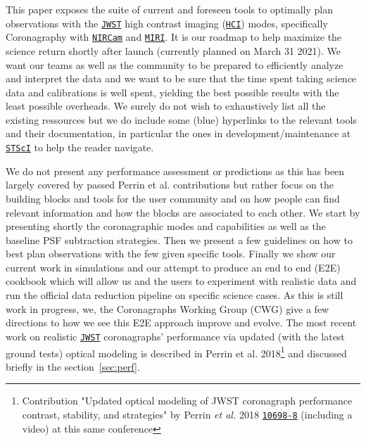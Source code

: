 \documentclass[]{spie}  %
\newcommand{\stsci}{{\tt \href{https://www.stsci.edu}{STScI}}\xspace}
\newcommand{\jwst}{{\tt \href{https://jwst.stsci.edu}{JWST}}\xspace}
\newcommand{\nircam}{{\tt \href{https://jwst.stsci.edu/instrumentation/nircam}{NIRCam}}\xspace}
\newcommand{\miri}{{\tt \href{https://jwst.stsci.edu/instrumentation/miri}{MIRI}}\xspace}
\newcommand{\hci}{{\tt \href{https://jwst-docs.stsci.edu/display/JPP/JWST+High-Contrast+Imaging?q=High}{HCI}}\xspace}%
\begin{document}
This paper exposes the suite of current and foreseen tools to optimally plan observations with the \jwst high contrast imaging\cite{jdox_hci} (\hci) modes, specifically Coronagraphy with \nircam and \miri. It is our roadmap to help maximize the science return shortly after launch (currently planned on March 31 2021).  We want our teams as well as the community to be prepared to efficiently analyze and interpret the data and we want to be sure that the time spent taking science data and calibrations is well spent, yielding the best possible results with the least possible overheads. We surely do not wish to exhaustively list all the existing ressources but we do include some (blue) hyperlinks to the relevant tools and their documentation\cite{jdox_general}, in particular the ones in development/maintenance at \stsci to help the reader navigate.

We do not present any performance assessment or predictions as this has been largely covered by passed Perrin et al. contributions \cite{perrin2014_webbPSF, perrin2016_JWST_WFS, perrin2018_JWST_AAS, perrin2018_JWST_coro_perfs} but rather focus on the building blocks and tools for the user community and on how people can find relevant information and how the blocks are associated to each other. We start by presenting shortly the coronagraphic modes and capabilities as well as the baseline PSF subtraction strategies. Then we present a few guidelines on how to best plan observations with the few given specific tools. Finally we show our current work in simulations and our attempt to produce an end to end (E2E) cookbook which will allow us and the users to experiment with realistic data and run the official data reduction pipeline on specific science cases. As this is still work in progress, we, the Coronagraphs Working Group (CWG)  give a few directions to how we see this E2E approach improve and evolve. The most recent work on realistic \jwst coronagraphs' performance via updated (with the latest ground tests) optical modeling is described in Perrin et al. 2018\cite{perrin2018_JWST_coro_perfs}\footnote{Contribution "Updated optical modeling of JWST coronagraph performance contrast, stability, and strategies" by Perrin {\em et al.} 2018 {\small \tt \href{https://www.spiedigitallibrary.org/conference-proceedings-of-spie/10698/1069809/Updated-optical-modeling-of-JWST-coronagraph-performance-contrast-stability-and/10.1117/12.2313552.full}{10698-8\cite{perrin2018_JWST_coro_perfs}}} (including a video) at this same conference}  and discussed briefly in the section~\ref{sec:perf}. 
\end{document}

